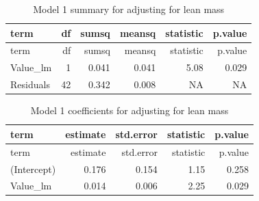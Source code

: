 \documentclass[]{article}
\newenvironment{Shaded}{\begin{snugshade}}{\end{snugshade}}
\newcommand{\CommentTok}[1]{\textcolor[rgb]{0.56,0.35,0.01}{\textit{#1}}}
\newcommand{\DataTypeTok}[1]{\textcolor[rgb]{0.13,0.29,0.53}{#1}}
\newcommand{\FloatTok}[1]{\textcolor[rgb]{0.00,0.00,0.81}{#1}}
\newcommand{\KeywordTok}[1]{\textcolor[rgb]{0.13,0.29,0.53}{\textbf{#1}}}
\newcommand{\NormalTok}[1]{#1}
\newcommand{\OperatorTok}[1]{\textcolor[rgb]{0.81,0.36,0.00}{\textbf{#1}}}
\newcommand{\StringTok}[1]{\textcolor[rgb]{0.31,0.60,0.02}{#1}}
\begin{document}
\begin{Shaded}
\end{Shaded}

\begin{longtable}[]{@{}lrrrrr@{}}
\caption{Model 1 summary for adjusting for lean mass}\tabularnewline
\toprule
term & df & sumsq & meansq & statistic & p.value\tabularnewline
\midrule
\endfirsthead
\toprule
term & df & sumsq & meansq & statistic & p.value\tabularnewline
\midrule
\endhead
Value\_lm & 1 & 0.041 & 0.041 & 5.08 & 0.029\tabularnewline
Residuals & 42 & 0.342 & 0.008 & NA & NA\tabularnewline
\bottomrule
\end{longtable}

\begin{Shaded}
\end{Shaded}

\begin{longtable}[]{@{}lrrrr@{}}
\caption{Model 1 coefficients for adjusting for lean
mass}\tabularnewline
\toprule
term & estimate & std.error & statistic & p.value\tabularnewline
\midrule
\endfirsthead
\toprule
term & estimate & std.error & statistic & p.value\tabularnewline
\midrule
\endhead
(Intercept) & 0.176 & 0.154 & 1.15 & 0.258\tabularnewline
Value\_lm & 0.014 & 0.006 & 2.25 & 0.029\tabularnewline
\bottomrule
\end{longtable}
\end{document}
